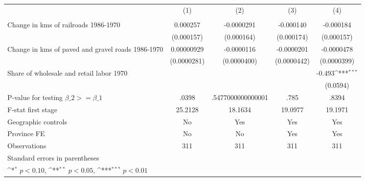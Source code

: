 {
\def\sym#1{\ifmmode^{#1}\else\(^{#1}\)\fi}
\begin{tabular}{l*{4}{c}}
\hline\hline
                &\multicolumn{1}{c}{(1)}&\multicolumn{1}{c}{(2)}&\multicolumn{1}{c}{(3)}&\multicolumn{1}{c}{(4)}\\
                &\multicolumn{1}{c}{}&\multicolumn{1}{c}{}&\multicolumn{1}{c}{}&\multicolumn{1}{c}{}\\
\hline
Change in kms of railroads 1986-1970& 0.000257         &-0.0000291         &-0.000140         &-0.000184         \\
                &(0.000157)         &(0.000164)         &(0.000174)         &(0.000157)         \\
[1em]
Change in kms of paved and gravel roads 1986-1970&0.00000929         &-0.0000116         &-0.0000201         &-0.0000478         \\
                &(0.0000281)         &(0.0000400)         &(0.0000442)         &(0.0000399)         \\
[1em]
Share of wholesale and retail labor 1970&                  &                  &                  &   -0.493\sym{***}\\
                &                  &                  &                  & (0.0594)         \\
\hline
P-value for testing $\beta\_{2} >= \beta\_{1}$&    .0398         &.5477000000000001         &     .785         &    .8394         \\
F-stat first stage&  25.2128         &  18.1634         &  19.0977         &  19.1971         \\
Geographic controls&       No         &      Yes         &      Yes         &      Yes         \\
Province FE     &       No         &       No         &      Yes         &      Yes         \\
Observations    &      311         &      311         &      311         &      311         \\
\hline\hline
\multicolumn{5}{l}{\footnotesize Standard errors in parentheses}\\
\multicolumn{5}{l}{\footnotesize \sym{*} \(p<0.10\), \sym{**} \(p<0.05\), \sym{***} \(p<0.01\)}\\
\end{tabular}
}
